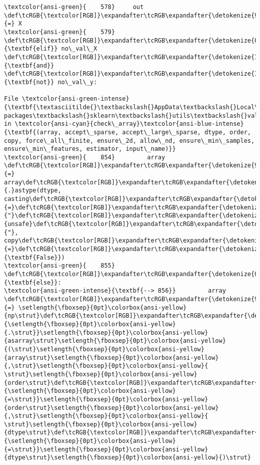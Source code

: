 \documentclass[11pt]{article}
\begin{document}
\begin{Verbatim}[commandchars=\\\{\}, frame=single, framerule=2mm, rulecolor=\color{outerrorbackground}]
\textcolor{ansi-green}{    578}     out \def\tcRGB{\textcolor[RGB]}\expandafter\tcRGB\expandafter{\detokenize{98,98,98}}{=} X
\textcolor{ansi-green}{    579} \def\tcRGB{\textcolor[RGB]}\expandafter\tcRGB\expandafter{\detokenize{0,135,0}}{\textbf{elif}} no\_val\_X \def\tcRGB{\textcolor[RGB]}\expandafter\tcRGB\expandafter{\detokenize{175,0,255}}{\textbf{and}} \def\tcRGB{\textcolor[RGB]}\expandafter\tcRGB\expandafter{\detokenize{175,0,255}}{\textbf{not}} no\_val\_y:

File \textcolor{ansi-green-intense}{\textbf{\textasciitilde{}\textbackslash{}AppData\textbackslash{}Local\textbackslash{}Programs\textbackslash{}Python\textbackslash{}Python310\textbackslash{}lib\textbackslash{}site-packages\textbackslash{}sklearn\textbackslash{}utils\textbackslash{}validation.py:856}}, in \textcolor{ansi-cyan}{check\_array}\textcolor{ansi-blue-intense}{\textbf{(array, accept\_sparse, accept\_large\_sparse, dtype, order, copy, force\_all\_finite, ensure\_2d, allow\_nd, ensure\_min\_samples, ensure\_min\_features, estimator, input\_name)}}
\textcolor{ansi-green}{    854}         array \def\tcRGB{\textcolor[RGB]}\expandafter\tcRGB\expandafter{\detokenize{98,98,98}}{=} array\def\tcRGB{\textcolor[RGB]}\expandafter\tcRGB\expandafter{\detokenize{98,98,98}}{.}astype(dtype, casting\def\tcRGB{\textcolor[RGB]}\expandafter\tcRGB\expandafter{\detokenize{98,98,98}}{=}\def\tcRGB{\textcolor[RGB]}\expandafter\tcRGB\expandafter{\detokenize{175,0,0}}{"}\def\tcRGB{\textcolor[RGB]}\expandafter\tcRGB\expandafter{\detokenize{175,0,0}}{unsafe}\def\tcRGB{\textcolor[RGB]}\expandafter\tcRGB\expandafter{\detokenize{175,0,0}}{"}, copy\def\tcRGB{\textcolor[RGB]}\expandafter\tcRGB\expandafter{\detokenize{98,98,98}}{=}\def\tcRGB{\textcolor[RGB]}\expandafter\tcRGB\expandafter{\detokenize{0,135,0}}{\textbf{False}})
\textcolor{ansi-green}{    855}     \def\tcRGB{\textcolor[RGB]}\expandafter\tcRGB\expandafter{\detokenize{0,135,0}}{\textbf{else}}:
\textcolor{ansi-green-intense}{\textbf{--> 856}}         array \def\tcRGB{\textcolor[RGB]}\expandafter\tcRGB\expandafter{\detokenize{98,98,98}}{=} \setlength{\fboxsep}{0pt}\colorbox{ansi-yellow}{np\strut}\def\tcRGB{\textcolor[RGB]}\expandafter\tcRGB\expandafter{\detokenize{98,98,98}}{\setlength{\fboxsep}{0pt}\colorbox{ansi-yellow}{.\strut}}\setlength{\fboxsep}{0pt}\colorbox{ansi-yellow}{asarray\strut}\setlength{\fboxsep}{0pt}\colorbox{ansi-yellow}{(\strut}\setlength{\fboxsep}{0pt}\colorbox{ansi-yellow}{array\strut}\setlength{\fboxsep}{0pt}\colorbox{ansi-yellow}{,\strut}\setlength{\fboxsep}{0pt}\colorbox{ansi-yellow}{ \strut}\setlength{\fboxsep}{0pt}\colorbox{ansi-yellow}{order\strut}\def\tcRGB{\textcolor[RGB]}\expandafter\tcRGB\expandafter{\detokenize{98,98,98}}{\setlength{\fboxsep}{0pt}\colorbox{ansi-yellow}{=\strut}}\setlength{\fboxsep}{0pt}\colorbox{ansi-yellow}{order\strut}\setlength{\fboxsep}{0pt}\colorbox{ansi-yellow}{,\strut}\setlength{\fboxsep}{0pt}\colorbox{ansi-yellow}{ \strut}\setlength{\fboxsep}{0pt}\colorbox{ansi-yellow}{dtype\strut}\def\tcRGB{\textcolor[RGB]}\expandafter\tcRGB\expandafter{\detokenize{98,98,98}}{\setlength{\fboxsep}{0pt}\colorbox{ansi-yellow}{=\strut}}\setlength{\fboxsep}{0pt}\colorbox{ansi-yellow}{dtype\strut}\setlength{\fboxsep}{0pt}\colorbox{ansi-yellow}{)\strut}

\end{Verbatim}
\end{document}
